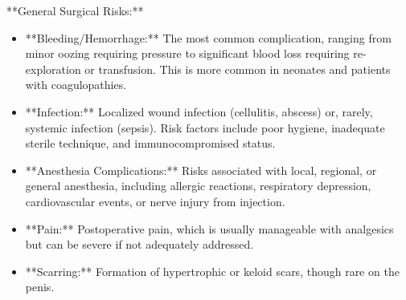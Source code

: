 **General Surgical Risks:**
\begin{itemize}
  \item **Bleeding/Hemorrhage:** The most common complication, ranging from minor oozing requiring pressure to significant blood loss requiring re-exploration or transfusion. This is more common in neonates and patients with coagulopathies.
  \item **Infection:** Localized wound infection (cellulitis, abscess) or, rarely, systemic infection (sepsis). Risk factors include poor hygiene, inadequate sterile technique, and immunocompromised status.
  \item **Anesthesia Complications:** Risks associated with local, regional, or general anesthesia, including allergic reactions, respiratory depression, cardiovascular events, or nerve injury from injection.
  \item **Pain:** Postoperative pain, which is usually manageable with analgesics but can be severe if not adequately addressed.
  \item **Scarring:** Formation of hypertrophic or keloid scars, though rare on the penis.
\end{itemize}

